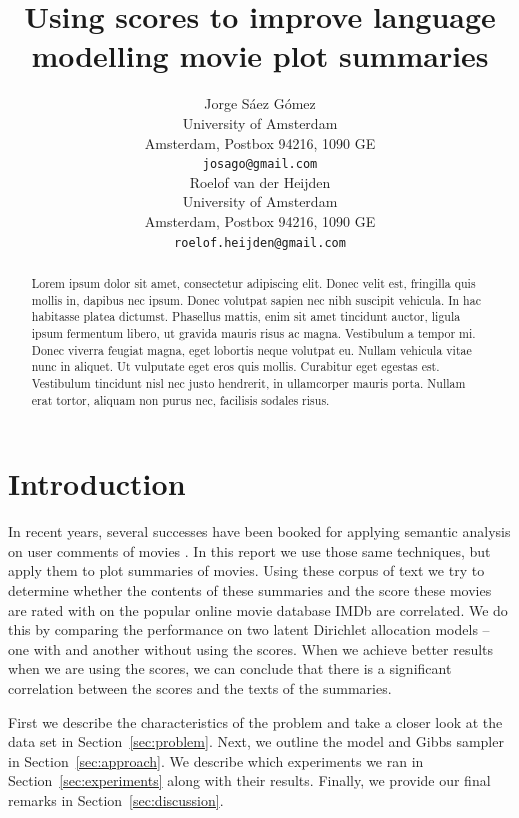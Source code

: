 \documentclass{article} %
\title{Using scores to improve language modelling movie plot summaries}
\author{
Jorge S\'{a}ez G\'{o}mez\\
University of Amsterdam\\
Amsterdam, Postbox 94216, 1090 GE\\
\texttt{josago@gmail.com} \\
\And
Roelof van der Heijden \\
University of Amsterdam\\
Amsterdam, Postbox 94216, 1090 GE\\
\texttt{roelof.heijden@gmail.com} \\
}
\begin{document}
\maketitle

\begin{abstract}
Lorem ipsum dolor sit amet, consectetur adipiscing elit. Donec velit est, fringilla quis mollis in, dapibus nec ipsum. Donec volutpat sapien nec nibh suscipit vehicula. In hac habitasse platea dictumst. Phasellus mattis, enim sit amet tincidunt auctor, ligula ipsum fermentum libero, ut gravida mauris risus ac magna. Vestibulum a tempor mi. Donec viverra feugiat magna, eget lobortis neque volutpat eu. Nullam vehicula vitae nunc in aliquet. Ut vulputate eget eros quis mollis. Curabitur eget egestas est. Vestibulum tincidunt nisl nec justo hendrerit, in ullamcorper mauris porta. Nullam erat tortor, aliquam non purus nec, facilisis sodales risus.
\end{abstract}

\section{Introduction} 
In recent years, several successes have been booked for applying semantic analysis on user comments of movies \cite{MovieRegression, PredictStars}.
In this report we use those same techniques, but apply them to plot summaries of movies.
Using these corpus of text we try to determine whether the contents of these summaries and the score these movies are rated with on the popular online movie database IMDb \cite{IMDb} are correlated.
We do this by comparing the performance on two latent Dirichlet allocation models -- one with and another without using the scores.
When we achieve better results when we are using the scores, we can conclude that there is a significant correlation between the scores and the texts of the summaries.

First we describe the characteristics of the problem and take a closer look at the data set in Section~\ref{sec:problem}.
Next, we outline the model and Gibbs sampler in Section~\ref{sec:approach}.
We describe which experiments we ran in Section~\ref{sec:experiments} along with their results.
Finally, we provide our final remarks in Section~\ref{sec:discussion}.
\end{document}
